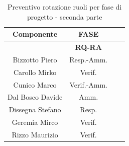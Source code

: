 \begin{table}[!h]
	\begin{center}
		  \begin{tabular}
			  {|c|c|c|c|}
			\hline
			\textbf{Componente} & \multicolumn{1}{|c|}{ \textbf{FASE} } \\
			\hline
			& \textbf{RQ-RA} \\
			\hline
			Bizzotto Piero & Resp.-Amm.   \\
			\hline
			Carollo Mirko & Verif.   \\
			\hline
			Cunico Marco & Verif.-Amm.   \\
			\hline
			Dal Bosco Davide & Amm.   \\
			\hline
			Dissegna Stefano & Resp.   \\
			\hline
			Geremia Mirco & Verif.   \\
			\hline
            Rizzo Maurizio  & Verif.\\
			\hline

		\end{tabular}
	\caption{Preventivo rotazione ruoli per fase di progetto - seconda parte} %
	\label{tab:TabellaRotazRuoliDue}
	\end{center}	
\end{table}
\newpage
{}

